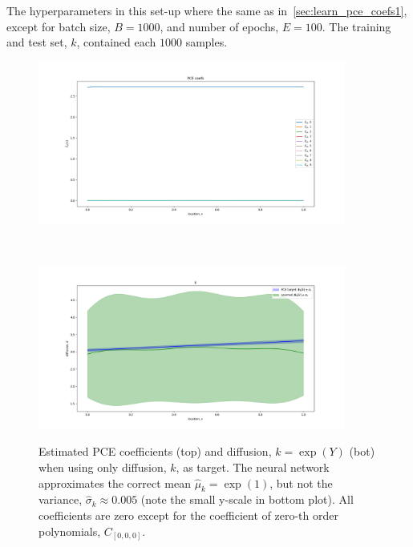 \documentclass[letterpaper, 10 pt, conference, twocolumn]{ieeeconf}  %
\begin{document}
The hyperparameters in this set-up where the same as in~\cref{sec:learn_pce_coefs1}, except for batch size, $B=1000$, and number of epochs, $E=100$. The training and test set, $k$, contained each $1000$ samples.
\begin{figure}[h!]
    \centering
    \begin{minipage}[b]{0.7\linewidth}
    \centering\includegraphics [trim=0 0 0 0, clip, width=0.9\textwidth, angle = 0]{figures/est_k_nn/nn_pce_coefs}
    \label{fig:est_k_nn_pce_coefs}
    \end{minipage}%
    \\
    \begin{minipage}[b]{0.7\linewidth}
    \centering\includegraphics [trim=0 0 0 0, clip, width=0.9\textwidth, angle = 0]{figures/est_k_nn/nn_k_samples}
    \label{fig:est_k_nn_k}
    \end{minipage}%
\caption{Estimated PCE coefficients (top) and diffusion, $k=\exp(Y)$ (bot) when using only diffusion, $k$, as target. The neural network approximates the correct mean $\hat \mu_k=\exp(1)$, but not the variance, $\hat \sigma_k \approx 0.005$ (note the small y-scale in bottom plot). All coefficients are zero except for the coefficient of zero-th order polynomials, $C_{[0,0,0]}$.}
\label{fig:est_k_nn}
\end{figure}
\end{document}

